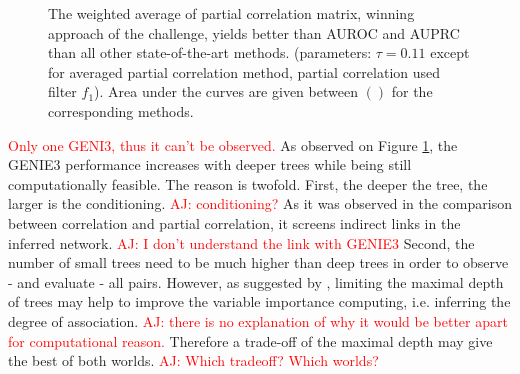 \documentclass[wcp]{jmlr}
\begin{document}
\begin{figure}[bth]
\centering
{}
\caption{The weighted average of partial correlation matrix, winning approach
         of the challenge, yields better than AUROC and AUPRC than all
         other state-of-the-art methods. (parameters: $\tau=0.11$ except for
         averaged partial correlation method, partial correlation used
         filter $f_1$). Area under the curves are given between $()$
         for the corresponding methods.}
\label{fig:curves}
\end{figure}

\textcolor{red}{Only one GENI3, thus it can't be observed.}
As observed on Figure \ref{fig:curves}, the GENIE3 performance increases with
deeper trees while being still computationally feasible. The reason is twofold.
First, the deeper the tree, the larger is the conditioning. \textcolor{red}{AJ:
conditioning?} As it was observed in the comparison between correlation and
partial correlation, it screens indirect links in the inferred network.
\textcolor{red}{AJ: I don't understand the link with GENIE3} Second, the number
of small trees need to be much higher than deep trees in order to observe - and
evaluate - all pairs.  However, as suggested by \cite{louppe2014understanding},
limiting the maximal depth of trees may help to improve the variable importance
computing, i.e. inferring the degree of association. \textcolor{red}{AJ: there
is no explanation of why it would be better apart for computational reason.}
Therefore a trade-off  of the maximal depth may give the best of both worlds.
\textcolor{red}{AJ:  Which tradeoff? Which worlds?}
\end{document}
